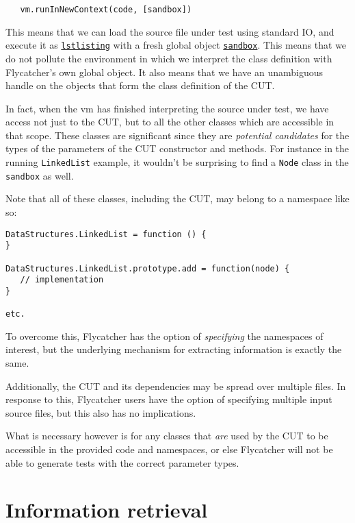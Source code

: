 \begin{lstlisting}
   vm.runInNewContext(code, [sandbox])
\end{lstlisting}

This means that we can load the source file under test using standard IO, and execute it as \texttt{\underline{lstlisting}} with a fresh global object \texttt{\underline{sandbox}}. This means that we do not pollute the environment in which we interpret the class definition with \textsf{Flycatcher}'s own global object. It also means that we have an unambiguous handle on the objects that form the class definition of the CUT.

In fact, when the vm has finished interpreting the source under test, we have access not just to the CUT, but to all the other classes which are accessible in that scope. These classes are significant since they are \emph{potential candidates} for the types of the parameters of the CUT constructor and methods. For instance in the running \texttt{LinkedList} example, it wouldn't be surprising to find a \texttt{Node} class in the \texttt{sandbox} as well.

Note that all of these classes, including the CUT, may belong to a namespace like so:

\begin{lstlisting}
DataStructures.LinkedList = function () {
}

DataStructures.LinkedList.prototype.add = function(node) {
   // implementation
}

etc.
\end{lstlisting}

To overcome this, \textsf{Flycatcher} has the option of \emph{specifying} the namespaces of interest, but the underlying mechanism for extracting information is exactly the same.

Additionally, the CUT and its dependencies may be spread over multiple files. In response to this, \textsf{Flycatcher} users have the option of specifying multiple input source files, but this also has no implications.

What is necessary however is for any classes that \emph{are} used by the CUT to be accessible in the provided code and namespaces, or else \textsf{Flycatcher} will not be able to generate tests with the correct parameter types.

\section{Information retrieval}

